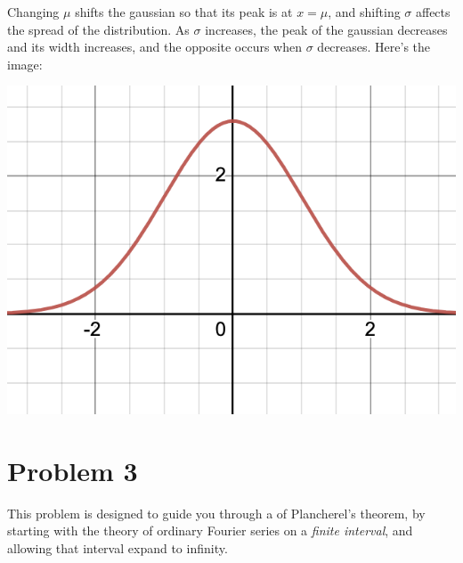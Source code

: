 \documentclass{article}
\begin{document}
\begin{enumerate}[label = (\alph*)]
\begin{solution}
    Changing $\mu$ shifts the gaussian so that its peak is at $x = \mu$, and shifting $\sigma$ affects the spread of the distribution. As $\sigma$ increases, the peak of the gaussian decreases and its width increases, and the opposite occurs when $\sigma$ decreases. Here's the image:
    \begin{center}
        \includegraphics[scale=0.5]{gaussian.png}
    \end{center}
\end{solution}
\end{enumerate}

\pagebreak
\section*{Problem 3}

This problem is designed to guide you through a  of Plancherel's theorem, by starting with the theory of ordinary Fourier series on a \textit{finite interval}, and allowing that interval expand to infinity. 
\end{document}
